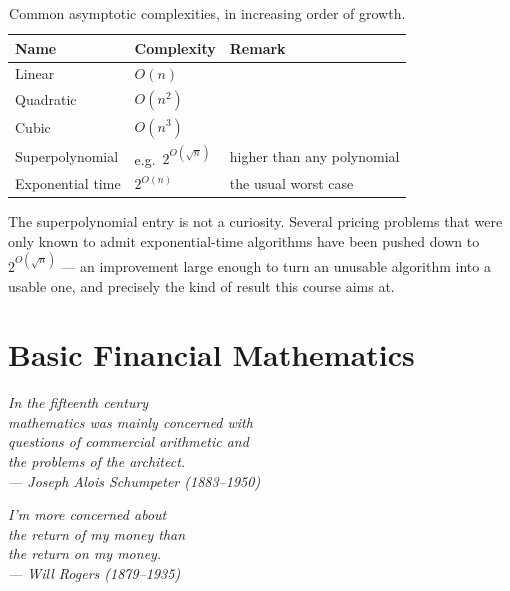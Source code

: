 \begin{table}[H]
	\centering
	\begin{tabular}{@{}l l l@{}}
		\toprule
		Name             & Complexity          & Remark                                    \\
		\midrule
		Linear           & $O(n)$              &                                           \\
		Quadratic        & $O(n^{2})$          &                                           \\
		Cubic            & $O(n^{3})$          &                                           \\
		Superpolynomial  & e.g.\ $2^{O(\sqrt{n})}$
		                 & higher than any polynomial\footnotemark                         \\
		Exponential time & $2^{O(n)}$          & the usual worst case                      \\
		\bottomrule
	\end{tabular}
	\caption{Common asymptotic complexities, in increasing order of growth.}
	\label{tab:complexities}
\end{table}

\suppstart
\begin{note}
	The superpolynomial entry is not a curiosity.
	Several pricing problems that were only known to admit exponential-time algorithms have been pushed down to $2^{O(\sqrt{n})}$ --- an improvement large enough to turn an unusable algorithm into a usable one, and precisely the kind of result this course aims at.
\end{note}
\suppend

\chapter{Basic Financial Mathematics}


\begin{flushright}
	\itshape In the fifteenth century\\
	mathematics was mainly concerned with\\
	questions of commercial arithmetic and\\
	the problems of the architect.\\
	\upshape --- Joseph Alois Schumpeter (1883--1950)

	\medskip

	\itshape I'm more concerned about\\
	the return \emph{of} my money than\\
	the return \emph{on} my money.\\
	\upshape --- Will Rogers (1879--1935)
\end{flushright}

